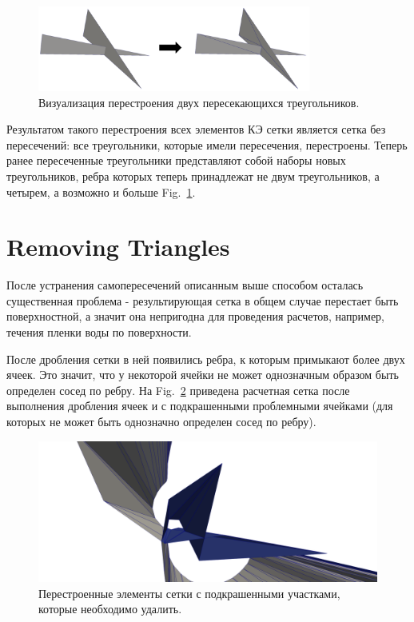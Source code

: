 \documentclass[
11pt,%
tightenlines,%
twoside,%
onecolumn,%
nofloats,%
nobibnotes,%
nofootinbib,%
superscriptaddress,%
noshowpacs,%
centertags]%
{revtex4}
\begin{document}
\begin{figure}[h]
\includegraphics[width=0.8\textwidth]{pics/pic_9.png}
\caption{Визуализация перестроения двух пересекающихся треугольников.}\label{fig:9}
\end{figure}

Результатом такого перестроения всех элементов КЭ сетки является сетка без пересечений: все треугольники, которые имели пересечения, перестроены. Теперь ранее пересеченные треугольники представляют собой наборы новых треугольников, ребра которых теперь принадлежат не двум треугольников, а четырем, а возможно и больше Fig.~\ref{fig:9}.

\section{Removing Triangles}

После устранения самопересечений описанным выше способом осталась существенная проблема - результирующая сетка в общем случае перестает быть поверхностной, а значит она непригодна для проведения расчетов, например, течения пленки воды по поверхности.

После дробления сетки в ней появились ребра, к которым примыкают более двух ячеек. Это значит, что у некоторой ячейки не может однозначным образом быть определен сосед по ребру. На Fig.~\ref{fig:10} приведена расчетная сетка после выполнения дробления ячеек и с подкрашенными проблемными ячейками (для которых не может быть однозначно определен сосед по ребру).

\begin{figure}[h]
\includegraphics[width=1.0\textwidth]{pics/pic_10.png}
\caption{Перестроенные элементы сетки с подкрашенными участками, которые необходимо удалить.}\label{fig:10}
\end{figure}
\end{document}
